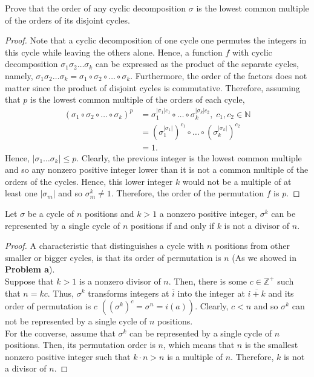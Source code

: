 \documentclass[12pt]{article}
\newcommand{\N}{\mathbb{N}}
\newcommand{\Z}{\mathbb{Z}}
\newenvironment{problem}[2][Problem]{\begin{trivlist} \item[\hskip \labelsep {\bfseries #1}\hskip \labelsep {\bfseries #2.}]}{\end{trivlist}}
\begin{document}
\begin{problem}{b}
  Prove that the order of any cyclic decomposition $\sigma$ is the lowest common multiple of the orders of its disjoint cycles. 
\begin{proof}
  Note that a cyclic decomposition of one cycle one permutes the integers in this cycle while leaving the others alone. Hence, a function $f$ with cyclic decomposition $\sigma_{1}\sigma_{2}\dots\sigma_{k}$ can be expressed as the product of the separate cycles, namely, $\sigma_{1}\sigma_{2}\dots\sigma_{k} = \sigma_{1}\circ\sigma_{2}\circ\dots\circ\sigma_{k}$. Furthermore, the order of the factors does not matter since the product of disjoint cycles is commutative. Therefore, assuming that $p$ is the lowest common multiple of the orders of each cycle, 
\begin{align*}
  \left(\sigma_{1}\circ\sigma_{2}\circ\dots\circ\sigma_{k}\right)^{p} &= \sigma_{1}^{|\sigma_{1}|c_{1}}\circ\dots\circ\sigma_{k}^{|\sigma_{k}|c_{2}}, \; c_{1},c_{2}\in \N\\ 
  &= \left(\sigma_{1}^{|\sigma_{1}|}\right)^{c_{1}}\circ\dots\circ\left(\sigma_{k}^{|\sigma_{k}|}\right)^{c_{2}}\\
  &= 1.
\end{align*}
Hence, $|\sigma_{1}\dots\sigma_{k}|\leq p$. Clearly, the previous integer is the lowest common multiple and so any nonzero positive integer lower than it is not a common multiple of the orders of the cycles. Hence, this lower integer $k$ would not be a multiple of at least one $|\sigma_{m}|$ and so $\sigma_{m}^{k}\neq 1$. Therefore, the order of the permutation $f$ is $p$.
\end{proof}
\end{problem}
\begin{problem}{c}
  Let $\sigma$ be a cycle of $n$ positions and $k>1$ a nonzero positive integer, $\sigma^{k}$ can be represented by a single cycle of $n$ positions if and only if $k$ is not a divisor of $n$.
\begin{proof}
  A characteristic that distinguishes a cycle with $n$ positions from other smaller or bigger cycles, is that its order of permutation is $n$ (As we showed in \textbf{Problem a}). \\
  Suppose that $k>1$ is a nonzero divisor of $n$. Then, there is some $c\in \Z^{+}$ such that $n=kc$. Thus, $\sigma^{k}$ transforms integers at $\overline{i}$ into the integer at $\overline{i+k}$ and its order of permutation is $c$ $\left( \left( \sigma^{k} \right)^{c} = \sigma^{n}=i(a) \right)$. Clearly, $c<n$ and so $\sigma^{k}$ can not be represented by a single cycle of $n$ positions.\\
  For the converse, assume that $\sigma^{k}$ can be represented by a single cycle of $n$ positions. Then, its permutation order is $n$, which means that $n$ is the smallest nonzero positive integer such that $k\cdot n>n$ is a multiple of $n$. Therefore, $k$ is not a divisor of $n$.
\end{proof}
\end{problem}
\end{document}
